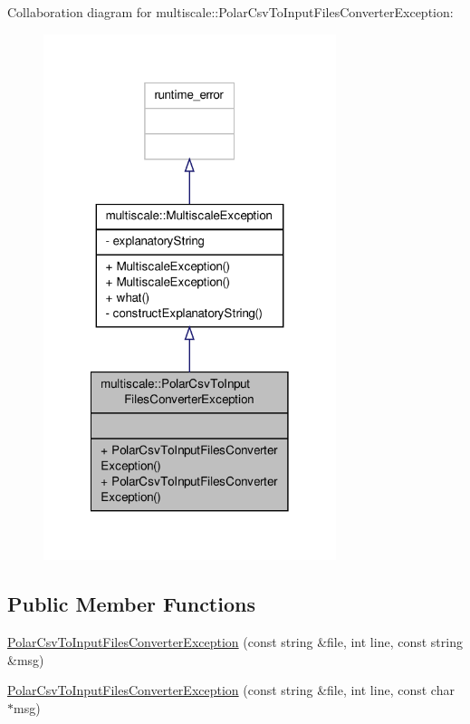Collaboration diagram for multiscale\-:\-:Polar\-Csv\-To\-Input\-Files\-Converter\-Exception\-:
\nopagebreak
\begin{figure}[H]
\begin{center}
\leavevmode
\includegraphics[width=242pt]{classmultiscale_1_1PolarCsvToInputFilesConverterException__coll__graph}
\end{center}
\end{figure}
\subsection*{Public Member Functions}
\begin{DoxyCompactItemize}
\item 
\hyperlink{classmultiscale_1_1PolarCsvToInputFilesConverterException_aad248ad53256f6a79ac3de1fedeab8f5}{Polar\-Csv\-To\-Input\-Files\-Converter\-Exception} (const string \&file, int line, const string \&msg)
\item 
\hyperlink{classmultiscale_1_1PolarCsvToInputFilesConverterException_a0c87ad44e5f7c60491bcb533d03c8677}{Polar\-Csv\-To\-Input\-Files\-Converter\-Exception} (const string \&file, int line, const char $\ast$msg)
\end{DoxyCompactItemize}


